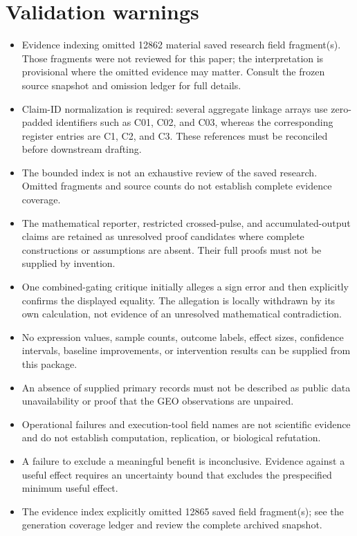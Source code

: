 \documentclass[11pt]{article}
\begin{document}
\section*{Validation warnings}
\begin{itemize}
\item Evidence indexing omitted 12862 material saved research field fragment(s). Those fragments were not reviewed for this paper; the interpretation is provisional where the omitted evidence may matter. Consult the frozen source snapshot and omission ledger for full details.
\item Claim-ID normalization is required: several aggregate linkage arrays use zero-padded identifiers such as C01, C02, and C03, whereas the corresponding register entries are C1, C2, and C3. These references must be reconciled before downstream drafting.
\item The bounded index is not an exhaustive review of the saved research. Omitted fragments and source counts do not establish complete evidence coverage.
\item The mathematical reporter, restricted crossed-pulse, and accumulated-output claims are retained as unresolved proof candidates where complete constructions or assumptions are absent. Their full proofs must not be supplied by invention.
\item One combined-gating critique initially alleges a sign error and then explicitly confirms the displayed equality. The allegation is locally withdrawn by its own calculation, not evidence of an unresolved mathematical contradiction.
\item No expression values, sample counts, outcome labels, effect sizes, confidence intervals, baseline improvements, or intervention results can be supplied from this package.
\item An absence of supplied primary records must not be described as public data unavailability or proof that the GEO observations are unpaired.
\item Operational failures and execution-tool field names are not scientific evidence and do not establish computation, replication, or biological refutation.
\item A failure to exclude a meaningful benefit is inconclusive. Evidence against a useful effect requires an uncertainty bound that excludes the prespecified minimum useful effect.
\item The evidence index explicitly omitted 12865 saved field fragment(s); see the generation coverage ledger and review the complete archived snapshot.

\end{itemize}
\end{document}
